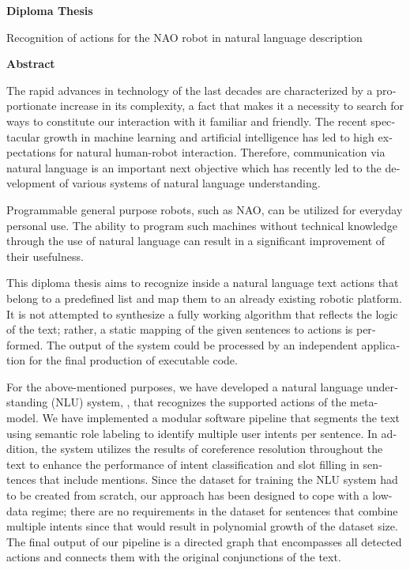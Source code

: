 \begin{english}
{}

\begin{center}
    \centering
    \textbf{\Large{Diploma Thesis}}

    \vspace{0.3cm}
    \large{Recognition of actions for the NAO robot in natural language description}

    \vspace{0.1cm}
    \centering
    \textbf{Abstract}
\end{center}

The rapid advances in technology of the last decades are characterized by a proportionate increase in its complexity, a fact that makes it a necessity to search for ways to constitute our interaction with it familiar and friendly.
The recent spectacular growth in machine learning and artificial intelligence has led to high expectations for natural human-robot interaction.
Therefore, communication via natural language is an important next objective which has recently led to the development of various systems of natural language understanding.

Programmable general purpose robots, such as NAO, can be utilized for everyday personal use.
The ability to program such machines without technical knowledge through the use of natural language can result in a significant improvement of their usefulness.

This diploma thesis aims to recognize inside a natural language text actions that belong to a predefined list and map them to an already existing robotic platform.
It is not attempted to synthesize a fully working algorithm that reflects the logic of the text; rather, a static mapping of the given sentences to actions is performed.
The output of the system could be processed by an independent application for the final production of executable code.

For the above-mentioned purposes, we have developed a natural language understanding (NLU) system, \projectname{}, that recognizes the supported actions of the \metamodel{} meta-model.
We have implemented a modular software pipeline that segments the text using semantic role labeling to identify multiple user intents per sentence.
In addition, the system utilizes the results of coreference resolution throughout the text to enhance the performance of intent classification and slot filling in sentences that include mentions.
Since the dataset for training the NLU system had to be created from scratch, our approach has been designed to cope with a low-data regime;
there are no requirements in the dataset for sentences that combine multiple intents since that would result in polynomial growth of the dataset size.
The final output of our pipeline is a directed graph that encompasses all detected actions and connects them with the original conjunctions of the text.


\end{english}
